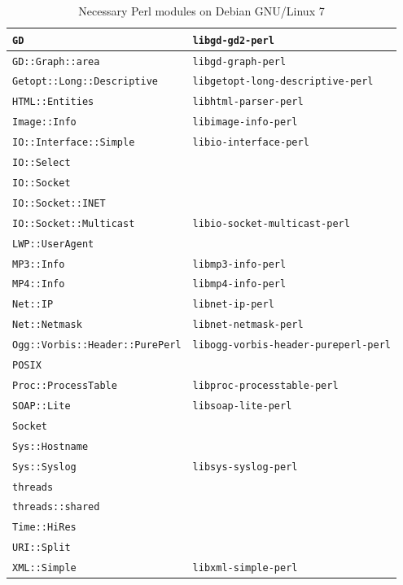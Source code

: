 \documentclass[a4paper,oneside,10pt]{report}
\begin{document}
\begin{table}
\begin{tabular}{|p{15em}|p{18em}|}
		\hline
		\verb|GD| 														& \verb|libgd-gd2-perl| \\
		\hline
		\verb|GD::Graph::area| 								& \verb|libgd-graph-perl| \\
		\hline
		\verb|Getopt::Long::Descriptive| 			& \verb|libgetopt-long-descriptive-perl| \\
		\hline
		\verb|HTML::Entities|									& \verb|libhtml-parser-perl| \\
		\hline
		\verb|Image::Info| 										& \verb|libimage-info-perl| \\
		\hline
		\verb|IO::Interface::Simple| 					& \verb|libio-interface-perl| \\
		\hline
		\verb|IO::Select| 										& \\
		\hline
		\verb|IO::Socket| 										& \\
		\hline
		\verb|IO::Socket::INET| 							& \\
		\hline
		\verb|IO::Socket::Multicast| 					& \verb|libio-socket-multicast-perl| \\
		\hline
		\verb|LWP::UserAgent| 								& \\
		\hline
		\verb|MP3::Info| 											& \verb|libmp3-info-perl| \\
		\hline
		\verb|MP4::Info| 											& \verb|libmp4-info-perl| \\
		\hline
		\verb|Net::IP| 												& \verb|libnet-ip-perl| \\
		\hline
		\verb|Net::Netmask| 									& \verb|libnet-netmask-perl| \\
		\hline
		\verb|Ogg::Vorbis::Header::PurePerl| 	& \verb|libogg-vorbis-header-pureperl-perl| \\
		\hline
		\verb|POSIX| 													& \\
		\hline
		\verb|Proc::ProcessTable| 						& \verb|libproc-processtable-perl| \\
		\hline
		\verb|SOAP::Lite| 										& \verb|libsoap-lite-perl| \\
		\hline
		\verb|Socket| 												& \\
		\hline
		\verb|Sys::Hostname| 									& \\
		\hline
		\verb|Sys::Syslog| 										& \verb|libsys-syslog-perl| \\
		\hline
		\verb|threads| 												& \\
		\hline
		\verb|threads::shared| 								& \\
		\hline
		\verb|Time::HiRes|										& \\
		\hline
		\verb|URI::Split| 										& \\
		\hline
		\verb|XML::Simple| 										& \verb|libxml-simple-perl| \\
		\hline
	\end{tabular}
	\caption{Necessary Perl modules on Debian GNU/Linux 7}
	\label{tab:NecessaryPerlModulesDebian7}
\end{table}
\end{document}
